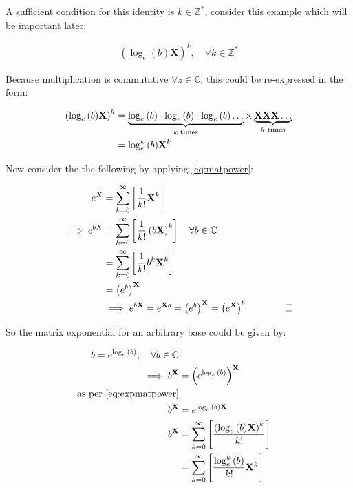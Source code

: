 \documentclass[11pt]{article}
\begin{document}
A sufficient condition for this identity is \(k \in
\mathbb{Z}^{*}\), consider this example which will be important later:

\begin{align}
    \left( \log_e{\left( b \right) }\mathbf{X} \right)^{k} , \quad \forall k \in \mathbb{Z^{*}}
\end{align}

Because multiplication is commutative \(\forall z \in \mathbb{C}\), this could be
re-expressed in the form:

\begin{align}
 \left( \log_e{\left( b \right) }\mathbf{X} \right)^{k} &=    \underbrace{\log_e{\left( b \right) }\cdot  \log_e{\left( b \right) } \cdot  \log_e{\left( b \right) }\ldots }_{k \text{ times}} \times \underbrace{\mathbf{X}\mathbf{X}\mathbf{X}\ldots}_{k \text{ times}} \notag \\
 &= \log_e^k{\left( b \right) } \mathbf{X}^k \label{eq:matpower}
\end{align}

Now consider the the following by applying \eqref{eq:matpower}:

\begin{align}
    e^{X}&= \sum^{\infty}_{k= 0}   \left[ \frac{1}{k!} \mathbf{X}^{k} \right]  \notag \\
    \implies  e^{bX}&= \sum^{\infty}_{k= 0}   \left[ \frac{1}{k!} \left( b\mathbf{X} \right)^{k} \right] \quad \forall b \in \mathbb{C} \notag \\
    &= \sum^{\infty}_{k= 0}   \left[ \frac{1}{k!}b^k \mathbf{X}^k \right] \notag \\
    &= \left( e^b \right)^{\mathbf{X}} \notag \\
    &\implies  e^{b \mathbf{X}} = e^{\mathbf{X}b}= \left( e^b \right)^{\mathbf{X}}= \left( e^{\mathbf{X}} \right)^b  \qquad \qquad \square \label{eq:expmatpower}
\end{align}

So the matrix exponential for an arbitrary base could be given by:

\begin{align}
   b = e^{\log_e{\left( b \right) }}, \quad \forall b \in \mathbb{C} \notag \\
    \implies  b^{\mathbf{X}} &= \left( e^{\log_e{\left( b \right) }} \right)^{\mathbf{X}} \notag \\
     \text{as per \eqref{eq:expmatpower}} \notag \\
    b^{\mathbf{X}} &=  e^{\log_e{\left( b \right) } {\mathbf{X}}}  \notag \\
     b^{\mathbf{X}} &= \sum^{\infty}_{k= 0}   \left[ \frac{\left( \log_e{\left( b \right) }\mathbf{X} \right)^k}{k!} \right]  \notag \\
     &= \sum^{\infty}_{k= 0}   \left[ \frac{\log_e ^{k}{\left( b \right) }}{k!}\mathbf{X}^{k} \right]
\end{align}
\end{document}
